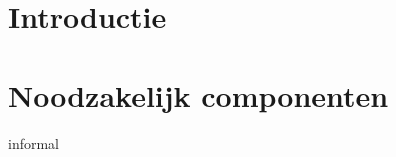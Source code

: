 \documentclass[a4paper,11pt]{article}
\begin{document}
	
	
	\tableofcontents
	\newpage

	\section{Introductie}
	
	\newpage

	\section{Noodzakelijk componenten}
	 {informal}
	\newpage
\end{document}
